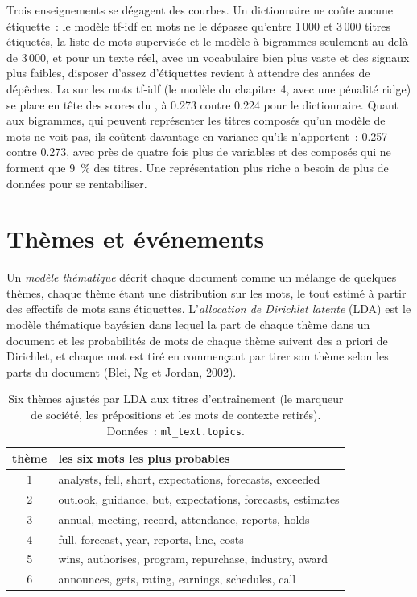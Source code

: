 Trois enseignements se dégagent des courbes. Un dictionnaire ne coûte aucune étiquette~: le modèle tf-idf en mots ne le dépasse qu'entre
1\,000 et 3\,000 titres étiquetés, la liste de mots supervisée et le modèle à bigrammes seulement au-delà de 3\,000, et pour un texte réel, avec
un vocabulaire bien plus vaste et des signaux plus faibles, disposer d'assez d'étiquettes revient à attendre des années de dépêches. La  sur les mots tf-idf (le modèle du chapitre~4, avec une pénalité ridge) se
place en tête des scores du , à 0.273 contre 0.224 pour le dictionnaire. Quant aux bigrammes, qui peuvent représenter les titres composés
qu'un modèle de mots ne voit pas, ils coûtent davantage en variance qu'ils n'apportent~: 0.257 contre 0.273, avec près de quatre fois
plus de variables et des composés qui ne forment que 9~\% des titres. Une représentation plus riche a besoin de plus de données pour se rentabiliser.

\section{Thèmes et événements}

\begin{definition}\label{def:ml:text-from-bag-of-words-to-embeddings:lda}
Un \emph{modèle thématique} décrit chaque document comme un mélange de quelques thèmes, chaque thème étant une distribution sur
les mots, le tout estimé à partir des effectifs de mots sans étiquettes. L'\emph{allocation de Dirichlet latente}
(LDA) est le modèle thématique bayésien dans lequel la part de chaque thème dans un document et les probabilités de mots de chaque thème suivent des
a priori de Dirichlet, et chaque mot est tiré en commençant par tirer son thème selon les parts du document (Blei, Ng et Jordan, 2002).
\end{definition}

\begin{table}[htbp]
\centering\small
\begin{tabular}{@{}cl@{}}
\toprule
thème & les six mots les plus probables\\
\midrule
1 & analysts, fell, short, expectations, forecasts, exceeded\\
2 & outlook, guidance, but, expectations, forecasts, estimates\\
3 & annual, meeting, record, attendance, reports, holds\\
4 & full, forecast, year, reports, line, costs\\
5 & wins, authorises, program, repurchase, industry, award\\
6 & announces, gets, rating, earnings, schedules, call\\
\bottomrule
\end{tabular}
\caption{Six thèmes ajustés par LDA aux titres d'entraînement (le marqueur de société, les prépositions et les mots de contexte
retirés). Données~: \texttt{ml\_text.topics}.}\label{tab:ml:text:topics}
\end{table}

